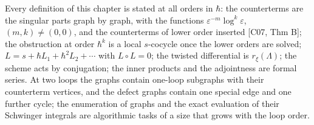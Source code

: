 \begin{remark}
Every definition of this chapter is stated at all orders in $\hbar$: the counterterms are the singular parts graph by graph, with the functions $\varepsilon^{-m}\log^k\varepsilon$, $(m,k)\neq(0,0)$, and the counterterms of lower order inserted [C07, Thm B]; the obstruction at order $\hbar^{k}$ is a local $s$-cocycle once the lower orders are solved; $L=s+\hbar L_1+\hbar^2L_2+\cdots$ with $L\circ L=0$; the twisted differential is $r_\xi(\Lambda)$; the scheme acts by conjugation; the inner products and the adjointness are formal series. At two loops the graphs contain one-loop subgraphs with their counterterm vertices, and the defect graphs contain one special edge and one further cycle; the enumeration of graphs and the exact evaluation of their Schwinger integrals are algorithmic tasks of a size that grows with the loop order.
\end{remark}
